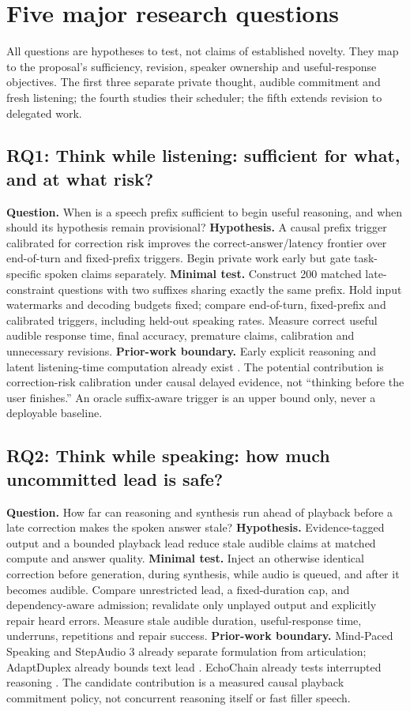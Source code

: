 \documentclass{article}
\newcommand{\researchquestion}[2]{\subsection{#1: #2}}
\begin{document}
\section{Five major research questions}
\label{sec:questions}
All questions are hypotheses to test, not claims of established novelty. They map to the proposal's sufficiency, revision, speaker ownership and useful-response objectives. The first three separate private thought, audible commitment and fresh listening; the fourth studies their scheduler; the fifth extends revision to delegated work.

\researchquestion{RQ1}{Think while listening: sufficient for what, and at what risk?}
\textbf{Question.} When is a speech prefix sufficient to begin useful reasoning, and when should its hypothesis remain provisional? \textbf{Hypothesis.} A causal prefix trigger calibrated for correction risk improves the correct-answer/latency frontier over end-of-turn and fixed-prefix triggers. Begin private work early but gate task-specific spoken claims separately. \textbf{Minimal test.} Construct 200 matched late-constraint questions with two suffixes sharing exactly the same prefix. Hold input watermarks and decoding budgets fixed; compare end-of-turn, fixed-prefix and calibrated triggers, including held-out speaking rates. Measure correct useful audible response time, final accuracy, premature claims, calibration and unnecessary revisions. \textbf{Prior-work boundary.} Early explicit reasoning and latent listening-time computation already exist \citep{thinklisten,flair}. The potential contribution is correction-risk calibration under causal delayed evidence, not ``thinking before the user finishes.'' An oracle suffix-aware trigger is an upper bound only, never a deployable baseline.

\researchquestion{RQ2}{Think while speaking: how much uncommitted lead is safe?}
\textbf{Question.} How far can reasoning and synthesis run ahead of playback before a late correction makes the spoken answer stale? \textbf{Hypothesis.} Evidence-tagged output and a bounded playback lead reduce stale audible claims at matched compute and answer quality. \textbf{Minimal test.} Inject an otherwise identical correction before generation, during synthesis, while audio is queued, and after it becomes audible. Compare unrestricted lead, a fixed-duration cap, and dependency-aware admission; revalidate only unplayed output and explicitly repair heard errors. Measure stale audible duration, useful-response time, underruns, repetitions and repair success. \textbf{Prior-work boundary.} Mind-Paced Speaking and StepAudio 3 already separate formulation from articulation; AdaptDuplex already bounds text lead \citep{mindpaced,step3,adapt}. EchoChain already tests interrupted reasoning \citep{echochain}. The candidate contribution is a measured causal playback commitment policy, not concurrent reasoning itself or fast filler speech.
\end{document}
